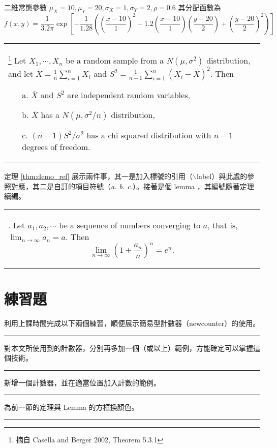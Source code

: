 \documentclass[12pt, a4paper]{article}
\begin{document}
\begin{ex} %
二維常態參數 $\mu_X=10, \mu_Y=20, \sigma_X=1, \sigma_Y=2, \rho=0.6$ 其分配函數為
\begin{equation*}
f(x,y)=\frac{1}{3.2\pi}\exp\left[-\frac{1}{1.28}\left((\frac{x-10}{1})^2
       -1.2(\frac{x-10}{1})(\frac{y-20}{2})+(\frac{y-20}{2})^2 \right)\right]
\end{equation*}
\end{ex}
\bigskip
\begin{center}\colorbox{slight}{\begin{tabular}{p{}}
\begin{thm}\label{thm:demo_ref}\footnote{摘自 Casella and Berger 2002, Theorem 5.3.1} %
Let $X_1, \cdots, X_n$ be a random sample from a $N(\mu, \sigma^2)$ distribution, and let
$\bar{X}=\frac{1}{n}\sum_{i=1}^n X_i$ and $S^2=\frac{1}{n-1}\sum_{i=1}^n (X_i-\bar{X})^2$.  Then
\begin{itemize}
\item[a.] $\bar{X}$ and $S^2$ are independent random variables,
\item[b.] $\bar{X}$ has a $N(\mu, \sigma^2/n)$ distribution,
\item[c.] $(n-1)S^2/\sigma^2$ has a chi squared distribution with $n-1$ degrees of freedom.
\end{itemize}
\end{thm}
 \end{tabular}}\end{center}
\bigskip

定理 \ref{thm:demo_ref} 展示兩件事，其一是加入標號的引用（$\backslash$label）與此處的參照對應，其二是自訂的項目符號（\textit{a. b. c.}）。接著是個 lemma ，其編號隨著定理續編。
\begin{center}\colorbox{slight}{\begin{tabular}{p{}}
\begin{lemma}. Let $a_1,a_2,\cdots$ be a sequence of numbers converging to $a$, that is, $\lim_{n\rightarrow \infty} a_n=a$. Then
$$\lim_{n\rightarrow \infty} (1+\frac{a_n}{n})^n=e^n.$$
\end{lemma}
 \end{tabular}}\end{center}

\section{練習題}
利用上課時間完成以下兩個練習，順便展示簡易型計數器（newcounter）的使用。

\rule{\textwidth}{0.2pt}
\thequiz \;\;對本文所使用到的計數器，分別再多加一個（或以上）範例，方能確定可以掌握這個技術。\\
\rule{\textwidth}{0.2pt}
\addtocounter{quiz}{1} 		%
\thequiz \;\;新增一個計數器，並在適當位置加入計數的範例。\\
\rule{\textwidth}{0.2pt}
\addtocounter{quiz}{1} 		%
\thequiz \;\;為前一節的定理與 Lemma 的方框換顏色。\\
\rule{\textwidth}{0.2pt}
\end{document}
